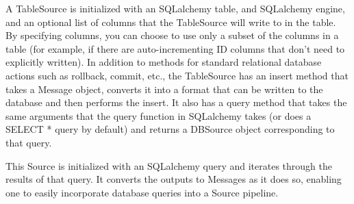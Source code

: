 \documentclass[letterpaper,10pt,english]{sphinxmanual}
\begin{document}

A TableSource is initialized with an SQLalchemy table, and SQLalchemy engine, and an optional list of columns that the TableSource will write
to in the table. By specifying columns, you can choose to use only a subset of the columns in a table (for example, if there are
auto-incrementing ID columns that don’t need to explicitly written).
In addition to methods for standard relational database actions such as rollback, commit, etc., the TableSource has an insert method that
takes a Message object, converts it into a format that can be written to the database and then performs the insert. It also has a query
method that takes the same arguments that the query function in SQLalchemy takes (or does a SELECT * query by default) and returns a DBSource
object corresponding to that query.


This Source is initialized with an SQLalchemy query and iterates through the results of that query. It converts the outputs to Messages as
it does so, enabling one to easily incorporate database queries into a Source pipeline.

\label{\detokenize{Fireworks:module-Fireworks.extensions.database}}
\end{document}
